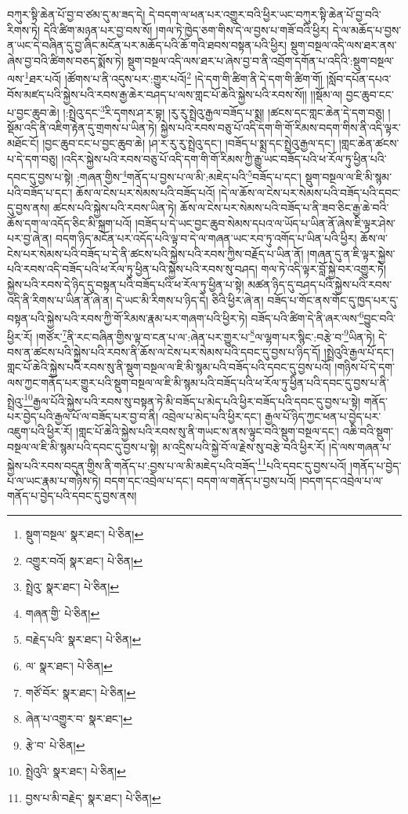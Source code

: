 བཀུར་སྟི་ཆེན་པོ་བྱ་བ་ཙམ་དུ་མ་ཟད་དེ། དེ་བདག་ལ་ཕན་པར་འགྱུར་བའི་ཕྱིར་ཡང་བཀུར་སྟི་ཆེན་པོ་བྱ་བའི་རིགས་ཏེ། དེའི་ཚིག་མཉན་པར་བྱ་བས་སོ། །གལ་ཏེ་ཁྱེད་ཅག་གིས་དེ་ལ་བྱས་པ་གཟོ་བའི་ཕྱིར། དེ་ལ་མཆོད་པ་བྱས་ན་ཡང་དེ་བཞིན་དུ་བྱ་ཞིང་མངོན་པར་མཆོད་པའི་ཆོ་གའི་ཐབས་བསྟན་པའི་ཕྱིར། སྡུག་བསྔལ་འདི་ལས་ཐར་ནས་ཞེས་བྱ་བའི་ཚིགས་བཅད་སྨོས་ཏེ། སྡུག་བསྔལ་འདི་ལས་ཐར་པ་ཞེས་བྱ་བ་ནི་འབྲོག་དགོན་པ་འདིའི་:སྡུག་བསྔལ་ལས་\footnote{སྡུག་བསྔལ་  སྣར་ཐང་།  པེ་ཅིན། }ཐར་པའོ། །ཚོགས་པ་ནི་འདུས་པར་:གྱུར་པའོ།\footnote{འགྱུར་བའོ།  སྣར་ཐང་།  པེ་ཅིན། } །དེ་དག་གི་ཚིག་ནི་དེ་དག་གི་ཚིག་གོ། །སློབ་དཔོན་དཔའ་བོས་མཛད་པའི་སྐྱེས་པའི་རབས་རྒྱ་ཆེར་བཤད་པ་ལས་གླང་པོ་ཆེའི་སྐྱེས་པའི་རབས་སོ།། །།སྡོམ་ལ། བྱང་ཆུབ་ངང་པ་བྱང་ཆུབ་ཆེ། །:སྤྲེའུ་དང་\footnote{སྤྲེའུ་  སྣར་ཐང་།  པེ་ཅིན། }རི་དྭགས་ཤ་ར་བྷ། །རུ་རུ་སྤྲེའུ་རྒྱལ་བཟོད་པ་སྨྲ། །ཚངས་དང་གླང་ཆེན་དེ་དག་བཅུ། །སྡོམ་འདི་ནི་འཇིག་རྟེན་དུ་གྲགས་པ་ཡིན་ཏེ། སྐྱེས་པའི་རབས་བཅུ་པོ་འདི་དག་གི་གོ་རིམས་བདག་གིས་ནི་འདི་ལྟར་མཐོང་ངོ། །བྱང་ཆུབ་ངང་པ་བྱང་ཆུབ་ཆེ། །ཤ་ར་རུ་རུ་སྤྲེའུ་དང་། །བཟོད་པ་སྨྲ་དང་སྤྲེའུ་རྒྱལ་དང་། །གླང་ཆེན་ཚངས་པ་དེ་དག་བཅུ། །འདིར་སྐྱེས་པའི་རབས་བཅུ་པོ་འདི་དག་གི་གོ་རིམས་ཀྱི་རྒྱུ་ཡང་བཟོད་པའི་ཕ་རོལ་ཏུ་ཕྱིན་པའི་དབང་དུ་བྱས་པ་སྟེ། :གཞན་གྱིས་\footnote{གཞན་གྱི་  པེ་ཅིན། }གནོད་པ་བྱས་པ་ལ་མི་:མཇེད་པའི་\footnote{བརྗེད་པའི་  སྣར་ཐང་།  པེ་ཅིན། }བཟོད་པ་དང་། སྡུག་བསྔལ་ལ་ཇི་མི་སྙམ་པའི་བཟོད་པ་དང་། ཆོས་ལ་ངེས་པར་སེམས་པའི་བཟོད་པའོ། །དེ་ལ་ཆོས་ལ་ངེས་པར་སེམས་པའི་བཟོད་པའི་དབང་དུ་བྱས་ནས། ཚངས་པའི་སྐྱེས་པའི་རབས་ཡིན་ཏེ། ཆོས་ལ་ངེས་པར་སེམས་པའི་བཟོད་པ་ནི་ཟབ་ཅིང་རྒྱ་ཆེ་བའི་ཆོས་དག་ལ་འདོད་ཅིང་མི་སྐྲག་པའོ། །བཟོད་པ་དེ་ཡང་བྱང་ཆུབ་སེམས་དཔའ་ལ་ཡོད་པ་ཡིན་ནོ་ཞེས་ཇི་ལྟར་ཤེས་པར་བྱ་ཞེ་ན། བདག་ཉིད་མངོན་པར་འདོད་པའི་ལྟ་བ་དེ་ལ་གཞན་ཡང་རབ་ཏུ་འགོད་པ་ཡིན་པའི་ཕྱིར། ཆོས་ལ་ངེས་པར་སེམས་པའི་བཟོད་པ་དེ་ནི་ཚངས་པའི་སྐྱེས་པའི་རབས་ཀྱིས་བརྗོད་པ་ཡིན་ནོ། །གཞན་དུ་ན་ཇི་ལྟར་སྐྱེས་པའི་རབས་འདི་བཟོད་པའི་ཕ་རོལ་ཏུ་ཕྱིན་པའི་སྐྱེས་པའི་རབས་སུ་བཤད། གལ་ཏེ་འདི་ལྟར་བློ་སྐྱེ་བར་འགྱུར་ཏེ། སྐྱེས་པའི་རབས་དེ་ཉིད་དུ་བསྟན་པའི་བཟོད་པའི་ཕ་རོལ་ཏུ་ཕྱིན་པ་སྟེ། མཚན་ཉིད་དུ་བཤད་པའི་སྐྱེས་པའི་རབས་འདི་ནི་རིགས་པ་ཡིན་ནོ་ཞེ་ན། དེ་ཡང་མི་རིགས་པ་ཉིད་དེ། ཅིའི་ཕྱིར་ཞེ་ན། བཟོད་པ་གོང་ནས་གོང་དུ་ཁྱད་པར་དུ་བསྟན་པའི་སྐྱེས་པའི་རབས་ཀྱི་གོ་རིམས་རྣམ་པར་གཞག་པའི་ཕྱིར་ཏེ། བཟོད་པའི་ཚིག་དེ་ནི་ཞར་ལས་\footnote{ལ་  སྣར་ཐང་།  པེ་ཅིན། }བྱུང་བའི་ཕྱིར་རོ། །གཙོར་\footnote{གཙོ་བོར་  སྣར་ཐང་།  པེ་ཅིན། }ནི་རང་བཞིན་གྱིས་ལྟ་བ་ངན་པ་ལ་:ཞེན་པར་གྱུར་པ་\footnote{ཞེན་པ་འགྱུར་བ་  སྣར་ཐང་། }ལ་ལྷག་པར་སྙིང་:བརྩེ་བ་\footnote{རྩེ་བ་  པེ་ཅིན། }ཡིན་ཏེ། དེ་བས་ན་ཚངས་པའི་སྐྱེས་པའི་རབས་ནི་ཆོས་ལ་ངེས་པར་སེམས་པའི་དབང་དུ་བྱས་པ་ཉིད་དོ། །སྤྲེའུའི་རྒྱལ་པོ་དང་། གླང་པོ་ཆེའི་སྐྱེས་པའི་རབས་སུ་ནི་སྡུག་བསྔལ་ལ་ཇི་མི་སྙམ་པའི་བཟོད་པའི་དབང་དུ་བྱས་པའོ། །གཉིས་པོ་དེ་དག་ལས་ཀྱང་གནོད་པར་གྱུར་པའི་སྡུག་བསྔལ་ལ་ཇི་མི་སྙམ་པའི་བཟོད་པའི་ཕ་རོལ་ཏུ་ཕྱིན་པའི་དབང་དུ་བྱས་པ་ནི་སྤྲེའུ་\footnote{སྤྲེའུའི་  སྣར་ཐང་།  པེ་ཅིན། }རྒྱལ་པོའི་སྐྱེས་པའི་རབས་སུ་བསྟན་ཏེ་མི་བཟོད་པ་མེད་པའི་ཕྱིར་བཟོད་པའི་དབང་དུ་བྱས་པ་སྟེ། གནོད་པར་བྱེད་པའི་རྒྱལ་པོ་ལ་བཟོད་པར་བྱ་བ་ནི། འབྲེལ་པ་མེད་པའི་ཕྱིར་དང་། རྒྱལ་པོ་ཉིད་ཀྱང་ཕན་པ་བྱེད་པར་འཇུག་པའི་ཕྱིར་རོ། །གླང་པོ་ཆེའི་སྐྱེས་པའི་རབས་སུ་ནི་གཡང་ས་ནས་ལྟུང་བའི་སྡུག་བསྔལ་དང་། འཆི་བའི་སྡུག་བསྔལ་ལ་ཇི་མི་སྙམ་པའི་དབང་དུ་བྱས་པ་སྟེ། མ་འདྲིས་པའི་སྐྱེ་བོ་ལ་རྗེས་སུ་བརྩེ་བའི་ཕྱིར་རོ། །དེ་ལས་གཞན་པ་སྐྱེས་པའི་རབས་བདུན་གྱིས་ནི་གནོད་པ་:བྱས་པ་ལ་མི་མཇེད་པའི་བཟོད་\footnote{བྱས་པ་མི་བརྗེད་  སྣར་ཐང་།  པེ་ཅིན། }པའི་དབང་དུ་བྱས་པའོ། །གནོད་པ་བྱེད་པ་ལ་ཡང་རྣམ་པ་གཉིས་ཏེ། བདག་དང་འབྲེལ་པ་དང་། བདག་ལ་གནོད་པ་བྱས་པའོ། །བདག་དང་འབྲེལ་པ་ལ་གནོད་པ་བྱེད་པའི་དབང་དུ་བྱས་ནས། 
